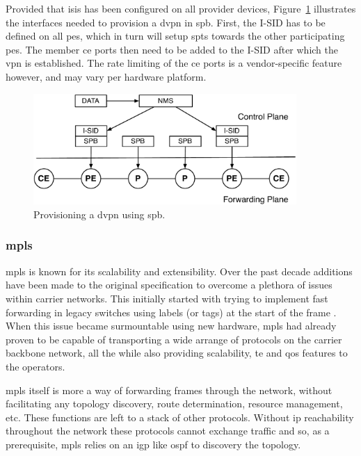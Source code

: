 Provided that \ac{isis} has been configured on all provider devices, Figure~\ref{fig:spb-stack} illustrates the interfaces needed to provision a \ac{dvpn} in \ac{spb}. First, the I-SID has to be defined on all \acp{pe}, which in turn will setup \acp{spt} towards the other participating \acp{pe}. The member \ac{ce} ports then need to be added to the I-SID after which the \ac{vpn} is established. The rate limiting of the \ac{ce} ports is a vendor-specific feature however, and may vary per hardware platform.

\begin{figure}[!h]
	\centering
	\includegraphics[width=10cm]{./includes/spb-stack.pdf}
	\caption{Provisioning a \ac{dvpn} using \ac{spb}.}
	\label{fig:spb-stack}
\end{figure}



\subsubsection{\acs{mpls}} %
\label{ssub:mpls}

\ac{mpls} is known for its scalability and extensibility. Over the past decade additions have been made to the original specification to overcome a plethora of issues within carrier networks. This initially started with trying to implement fast forwarding in legacy switches using labels (or tags) at the start of the frame \cite{tag-switching}. When this issue became surmountable using new hardware, \ac{mpls} had already proven to be capable of transporting a wide arrange of protocols on the carrier backbone network, all the while also providing scalability, \ac{te} and \ac{qos} features to the operators.

\ac{mpls} itself is more a way of forwarding frames through the network, without facilitating any topology discovery, route determination, resource management, etc. These functions are left to a stack of other protocols. Without \ac{ip} reachability throughout the network these protocols cannot exchange traffic and so, as a prerequisite, \ac{mpls} relies on an \ac{igp} like \ac{ospf} to discovery the topology.

